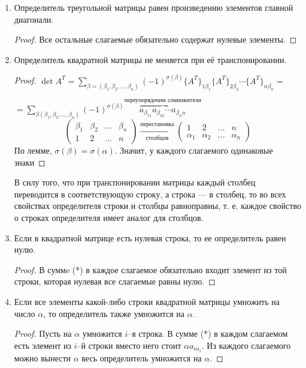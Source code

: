 \begin{enumerate}
\item Определитель треугольной матрицы равен произведению элементов главной диагонали.
\begin{proof}
Все остальные слагаемые обязательно содержат нулевые элементы.
\end{proof}
\item Определитель квадратной матрицы не меняется при её транспонировании.
\begin{proof}
$\det A^T=\sum\limits_{\beta=(\beta_1,\beta_2,\ldots,\beta_n)}(-1)^{\sigma(\beta)}\{A^T\}_{1\beta_1}\{A^T\}_{2\beta_2}\cdots{}\{A^T\}_{n\beta_n}=$

$=\sum\limits_{\beta(\beta_1,\beta_2,\ldots,\beta_n)}
(-1)^{\sigma(\beta)}
\overbrace{a_{\beta_11}a_{\beta_22}\cdots{}a_{\beta_nn}}\limits^{\mbox{переупорядочим сомножители}}$
$$
\begin{pmatrix}
\beta_1 & \beta_2 & \ldots & \beta_n \\
1        & 2        & \ldots & n
\end{pmatrix} \xrightarrow[\mbox{столбцов}]{\mbox{перестановка}}
\begin{pmatrix}
1       & 2       & \ldots & n       \\
\alpha_1 & \alpha_2 & \ldots & \alpha_n
\end{pmatrix}
$$
По лемме, $\sigma(\beta)=\sigma(\alpha)$. Значит, у каждого слагаемого одинаковые знаки
\end{proof}
\begin{remark}
В силу того, что при транспонировании матрицы каждый столбец переводится в соответствующую строку, а строка --- в столбец, то во всех свойствах определителя строки и столбцы равноправны, т. е. каждое свойство о строках определителя имеет аналог для столбцов.
\end{remark}
\item Если в квадратной матрице есть нулевая строка, то ее определитель равен нулю.
\begin{proof}
В суммe (*) в каждое слагаемое обязательно входит элемент из той строки, которая нулевая \then все слагаемые равны нулю.
\end{proof}
\item Если все элементы какой-либо строки квадратной матрицы умножить на число $\alpha$, то определитель также умножится на $\alpha$.
\begin{proof}
Пусть на $\alpha$ умножится $i$--я строка. В сумме (*) в каждом слагаемом есть элемент из $i$--й строки \then вместо него стоит $\alpha{}a_{i\alpha_i}$. Из каждого слагаемого можно вынести $\alpha$ \then весь определитель умножится на $\alpha$.

\end{proof}
\end{enumerate}
